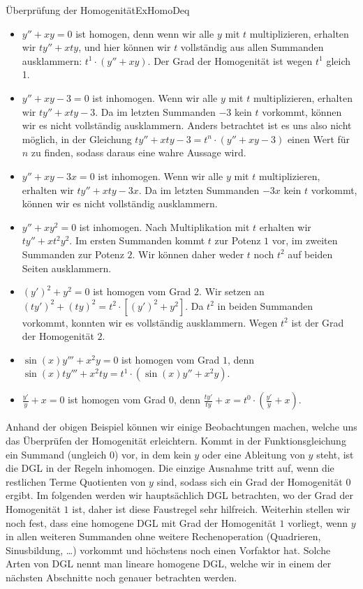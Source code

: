 \begin{example}{Überprüfung der Homogenität}{ExHomoDeq}
    \begin{itemize}
        \item $y''+xy=0$ ist homogen, denn wenn wir alle $y$ mit $t$ multiplizieren, erhalten wir $ty''+xty$, und hier können wir $t$ vollständig aus allen Summanden ausklammern: $t^1 \cdot (y''+xy)$. Der Grad der Homogenität ist wegen $t^1$ gleich 1.
        \item $y''+xy-3=0$ ist inhomogen. Wenn wir alle $y$ mit $t$ multiplizieren, erhalten wir $ty''+xty-3$. Da im letzten Summanden $-3$ kein $t$ vorkommt, können wir es nicht vollständig ausklammern. Anders betrachtet ist es uns also nicht möglich, in der Gleichung $ty''+xty-3 = t^n \cdot (y''+xy-3)$ einen Wert für $n$ zu finden, sodass daraus eine wahre Aussage wird.
        \item $y''+xy-3x=0$ ist inhomogen. Wenn wir alle $y$ mit $t$ multiplizieren, erhalten wir $ty''+xty-3x$. Da im letzten Summanden $-3x$ kein $t$ vorkommt, können wir es nicht vollständig ausklammern.
        \item $y''+xy^2=0$ ist inhomogen. Nach Multiplikation mit $t$ erhalten wir $ty''+xt^2y^2$. Im ersten Summanden kommt $t$ zur Potenz $1$ vor, im zweiten Summanden zur Potenz $2$. Wir können daher weder $t$ noch $t^2$ auf beiden Seiten ausklammern.
        \item $(y')^2+y^2=0$ ist homogen vom Grad $2$. Wir setzen an $(ty')^2+(ty)^2=t^2\cdot\left[(y')^2+y^2\right]$. Da $t^2$ in beiden Summanden vorkommt, konnten wir es vollständig ausklammern. Wegen $t^2$ ist der Grad der Homogenität $2$.
        \item $\sin(x)y'''+x^2y=0$ ist homogen vom Grad $1$, denn $\sin(x)ty'''+x^2 t y = t^1 \cdot \left(\sin(x)y''+x^2y\right)$.
        \item $\frac{y'}{y}+x=0$ ist homogen vom Grad $0$, denn $\frac{ty'}{ty}+x = t^0 \cdot \left(\frac{y'}{y}+x\right)$.
   \end{itemize}
\end{example}

Anhand der obigen Beispiel können wir einige Beobachtungen machen, welche uns das Überprüfen der Homogenität erleichtern. Kommt in der Funktionsgleichung ein Summand (ungleich 0) vor, in dem kein $y$ oder eine Ableitung von $y$ steht, ist die DGL in der Regeln inhomogen. Die einzige Ausnahme tritt auf, wenn die restlichen Terme Quotienten von $y$ sind, sodass sich ein Grad der Homogenität $0$ ergibt. Im folgenden werden wir hauptsächlich DGL betrachten, wo der Grad der Homogenität $1$ ist, daher ist diese Faustregel sehr hilfreich.  Weiterhin stellen wir noch fest, dass eine homogene DGL mit Grad der Homogenität $1$ vorliegt, wenn $y$ in allen weiteren Summanden ohne weitere Rechenoperation (Quadrieren, Sinusbildung, \dots) vorkommt und höchstens noch einen Vorfaktor hat. Solche Arten von DGL nennt man lineare homogene DGL, welche wir in einem der nächsten Abschnitte noch genauer betrachten werden.

